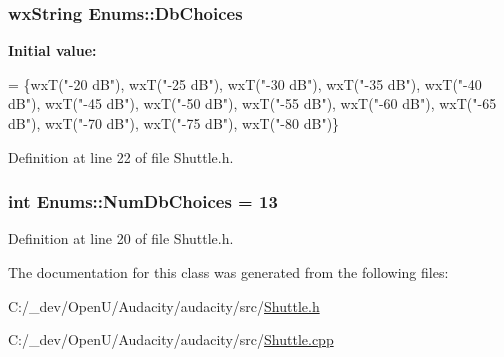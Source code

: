 \subsubsection[{\texorpdfstring{Db\+Choices}{DbChoices}}]{ wx\+String Enums\+::\+Db\+Choices\hspace{0.3cm}{\ttfamily [static]}}\hypertarget{class_enums_a9417be74f0aabc332d79926d0a244a94}{}\label{class_enums_a9417be74f0aabc332d79926d0a244a94}
{\bfseries Initial value\+:}
\begin{DoxyCode}
=
   \{wxT(\textcolor{stringliteral}{"-20 dB"}), wxT(\textcolor{stringliteral}{"-25 dB"}), wxT(\textcolor{stringliteral}{"-30 dB"}),
    wxT(\textcolor{stringliteral}{"-35 dB"}), wxT(\textcolor{stringliteral}{"-40 dB"}), wxT(\textcolor{stringliteral}{"-45 dB"}),
    wxT(\textcolor{stringliteral}{"-50 dB"}), wxT(\textcolor{stringliteral}{"-55 dB"}), wxT(\textcolor{stringliteral}{"-60 dB"}),
    wxT(\textcolor{stringliteral}{"-65 dB"}), wxT(\textcolor{stringliteral}{"-70 dB"}), wxT(\textcolor{stringliteral}{"-75 dB"}),
    wxT(\textcolor{stringliteral}{"-80 dB"})\}
\end{DoxyCode}


Definition at line 22 of file Shuttle.\+h.

\subsubsection[{\texorpdfstring{Num\+Db\+Choices}{NumDbChoices}}]{ {\bf int} Enums\+::\+Num\+Db\+Choices = 13\hspace{0.3cm}{\ttfamily [static]}}\hypertarget{class_enums_af68f2c8c485e9bdce28e025246d686aa}{}\label{class_enums_af68f2c8c485e9bdce28e025246d686aa}


Definition at line 20 of file Shuttle.\+h.



The documentation for this class was generated from the following files\+:\begin{DoxyCompactItemize}
\item 
C\+:/\+\_\+dev/\+Open\+U/\+Audacity/audacity/src/\hyperlink{_shuttle_8h}{Shuttle.\+h}\item 
C\+:/\+\_\+dev/\+Open\+U/\+Audacity/audacity/src/\hyperlink{_shuttle_8cpp}{Shuttle.\+cpp}\end{DoxyCompactItemize}
